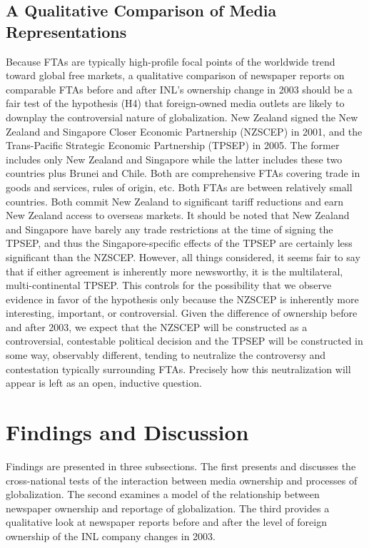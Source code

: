 \documentclass[12pt]{report}
\begin{document}
\subsection{A Qualitative Comparison of Media Representations}
	Because FTAs are typically high-profile focal points of the worldwide trend toward global free markets, a qualitative comparison of newspaper reports on comparable FTAs before and after INL's ownership change in 2003 should be a fair test of the hypothesis (H4) that foreign-owned media outlets are likely to downplay the controversial nature of globalization. New Zealand signed the New Zealand and Singapore Closer Economic Partnership (NZSCEP) in 2001, and the Trans-Pacific Strategic Economic Partnership (TPSEP) in 2005. The former includes only New Zealand and Singapore while the latter includes these two countries plus Brunei and Chile. Both are comprehensive FTAs covering trade in goods and services, rules of origin, etc. Both FTAs are between relatively small countries. Both commit New Zealand to significant tariff reductions and earn New Zealand access to overseas markets. It should be noted that New Zealand and Singapore have barely any trade restrictions at the time of signing the TPSEP, and thus the Singapore-specific effects of the TPSEP are certainly less significant than the NZSCEP. However, all things considered, it seems fair to say that if either agreement is inherently more newsworthy, it is the multilateral, multi-continental TPSEP. This controls for the possibility that we observe evidence in favor of the hypothesis only because the NZSCEP is inherently more interesting, important, or controversial. Given the difference of ownership before and after 2003, we expect that the NZSCEP will be constructed as a controversial, contestable political decision and the TPSEP will be constructed in some way, observably different, tending to neutralize the controversy and contestation typically surrounding FTAs. Precisely how this neutralization will appear is left as an open, inductive question.


\section{Findings and Discussion}
Findings are presented in three subsections. The first presents and discusses the cross-national tests of the interaction between media ownership and processes of globalization. The second examines a model of the relationship between newspaper ownership and reportage of globalization. The third provides a qualitative look at newspaper reports before and after the level of foreign ownership of the INL company changes in 2003.
\end{document}
